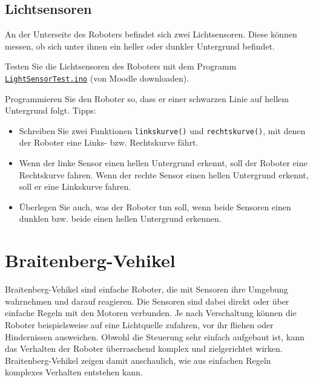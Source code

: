 \subsection{Lichtsensoren}
An der Unterseite des Roboters befindet sich zwei Lichtsensoren. Diese können messen, ob sich unter ihnen ein heller oder dunkler Untergrund befindet.

\begin{myexercise}
    \begin{aenum}
        \item Testen Sie die Lichtsensoren des Roboters mit dem Programm \hyperref[lst:lichtsensor-test]{\texttt{LightSensorTest.ino}} (von Moodle downloaden).
        \item Programmieren Sie den Roboter so, dass er einer schwarzen Linie auf hellem Untergrund folgt.\newline
              Tipps:
              \begin{itemize}
                  \item Schreiben Sie zwei Funktionen \lstinline|linkskurve()|
                        und \lstinline|rechtskurve()|, mit denen der Roboter
                        eine Links- bzw. Rechtskurve fährt.

                  \item Wenn der linke Sensor einen hellen Untergrund erkennt,
                        soll der Roboter eine Rechtskurve fahren. Wenn der rechte
                        Sensor einen hellen Untergrund erkennt, soll er eine
                        Linkskurve fahren.
                  \item Überlegen Sie auch, was der Roboter tun soll, wenn beide Sensoren
                        einen dunklen bzw. beide einen hellen Untergrund erkennen.
              \end{itemize}

    \end{aenum}
\end{myexercise}


\clearpage

\section{Braitenberg-Vehikel}
Braitenberg-Vehikel sind einfache Roboter, die mit Sensoren ihre Umgebung wahrnehmen und darauf reagieren. Die Sensoren sind dabei direkt oder über einfache Regeln mit den Motoren verbunden. Je nach Verschaltung können die Roboter beispielsweise auf eine Lichtquelle zufahren, vor ihr fliehen oder Hindernissen ausweichen. Obwohl die Steuerung sehr einfach aufgebaut ist, kann das Verhalten der Roboter überraschend komplex und zielgerichtet wirken. Braitenberg-Vehikel zeigen damit anschaulich, wie aus einfachen Regeln komplexes Verhalten entstehen kann.

